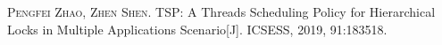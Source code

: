 
\begin{publications}{99}
    \item\textsc{Pengfei Zhao, Zhen Shen}. {TSP: A Threads Scheduling Policy for Hierarchical Locks in Multiple Applications Scenario}[J]. ICSESS, 2019, 91:183518.
\end{publications}
